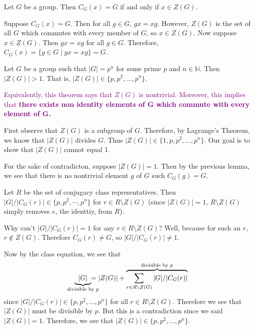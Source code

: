     \begin{lemma}
        Let $G$ be a group. Then $C_G(x) = G$ if and only if $x \in Z(G)$.
    \end{lemma}

    \begin{prf}
        Suppose $C_G(x) = G$. Then for all $g \in G$, $gx = xg$.
        However, $Z(G)$ is the set of all $G$ which commutes with
        every member of $G$, so $x \in Z(G)$. 
        Now suppose $x \in Z(G)$. Then $gx = xg$ for all $g \in G$.
        Therefore, $C_G(x) = \{g \in G \mid gx = xg\} = G$.
    \end{prf}

    \begin{thm} \label{center_lemma}
        Let $G$ be a group such that $|G| = p^n$ for some prime $p$
        and $n \in \mathbb{N}$. Then $|Z(G)| > 1$. That is, $|Z(G)|
        \in \{p, p^2, \dots, p^{n}\}$.
    \end{thm}
    \textcolor{Purple}{Equivalently, this theorem says that $Z(G)$ is nontrivial.
    Moreover, this implies that \textbf{there exists
    non identity elements of $\mathbf{G}$ which commute with every
    element of $\mathbf{G}$.}}

    \begin{prf}
        First observe that $Z(G)$ is a subgroup of $G$. Therefore, by
        Lagrange's Theorem, we know that $|Z(G)|$ divides $G$. Thus
        $|Z(G)| \in \{1, p, p^2, \dots, p^{n}\}$. Our goal is to show
        that $|Z(G)|$ cannot equal 1.

        \textcolor{NavyBlue}{For the sake of contradicton, suppose $|Z(G)| = 1$}. Then by
        the previous lemma, we see that 
        there is no nontrivial element $g$ of $G$ such $C_G(g) = G$.

        Let $R$ be the set of conjugacy class representatives. 
        Then $|G|/|C_G(r)| \in \{p, p^2, \cdots, p^n\}$ for $r \in
        R\setminus Z(G)$ (since $|Z(G)| = 1$, $R\setminus Z(G)$ simply
        removes $e$, the identtiy, from $R$).

        \textcolor{red!40!purple!100}{Why can't $|G|/|C_G(r)| = 1$ for any $r \in
        R\setminus Z(G)$? Well, because for such an $r$, $r \not\in
        Z(G)$. Therefore $C_G(r) \ne G$, so $|G|/|C_G(r)| \ne 1$.}

        Now by the class equation, we see that 
        \[
            \underbrace{ \hspace{.2cm}|G|\hspace{.2cm}   }_{\text{divisible by } p} \hspace{-.5cm} = |Z(G)| + \overbrace{\sum_{r \in R\setminus Z(G)} |G|/|C_G(r)|}^{\text{divisible by } p}
        \]
        since $|G|/|C_G(r)| \in \{p, p^2, \dots, p^n\}$ for all $r \in
        R\setminus Z(G)$. \textcolor{NavyBlue}{Therefore we see that $|Z(G)|$ must be
        divisible by $p$. But this is a contradiction since we said
        $|Z(G)| = 1$}. Therefore, we see that $|Z(G)| \in \{p, p^2,
        \dots, p^n\}$.
        
    \end{prf}

